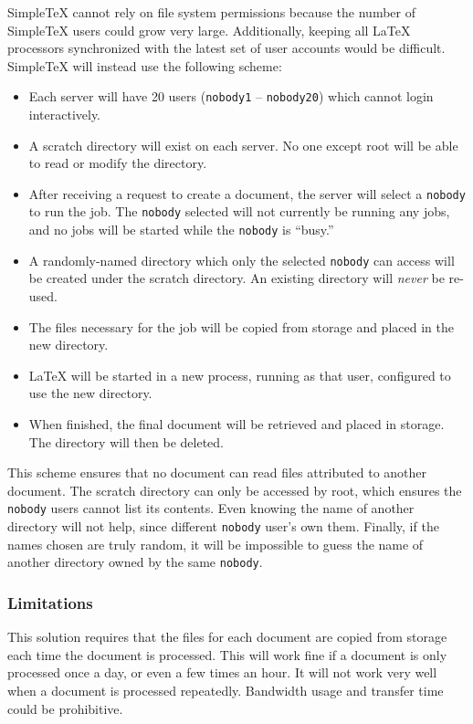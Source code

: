 \documentclass[11pt]{article}
\newcommand\STex{Simple\TeX\xspace}
\newcommand\LTex{\LaTeX\xspace}
\begin{document}
\STex
cannot rely on file system permissions because the number of \STex
users could grow very large. Additionally, keeping all \LTex
processors synchronized with the latest set of user accounts would be
difficult. \STex will instead use the following scheme:

\begin{itemize}
\item Each server will have 20 users (\texttt{nobody1} --
  \texttt{nobody20}) which cannot login interactively.
\item A scratch directory will exist on each server. No one except
  root will be able to read or modify the directory.
\item After receiving a request to create a document, the server will
  select a \texttt{nobody} to run the job. The \texttt{nobody} selected will not currently
  be running any jobs, and no jobs will be started while the \texttt{nobody} is
  ``busy.''
\item A randomly-named directory which only the selected
  \texttt{nobody} can access will be created under the scratch
  directory. An existing directory will \emph{never} be re-used.
\item The files necessary for the job will be copied from storage and
  placed in the new directory. 
\item \LTex will be started in a new process, running as that user,
  configured to use the new directory.
\item When finished, the final document will be retrieved
  and placed in storage. The directory will then be
  deleted.
\end{itemize}

This scheme ensures that no document can read files attributed to
another document. The scratch directory can only be accessed by root,
which ensures the \texttt{nobody} users cannot list its contents. Even
knowing the name of another directory will not help, since different
\texttt{nobody} user's own them. Finally, if the names chosen are
truly random, it will be impossible to guess the name of another
directory owned by the same \texttt{nobody}.

\subsubsection{Limitations}

This solution requires that the files for each document are copied from
storage each time the document is processed. This will work fine if a document
is only processed once a day, or even a few times an hour. It will not work very well when a document is processed repeatedly. Bandwidth usage and
transfer time could be prohibitive. 
\end{document}
